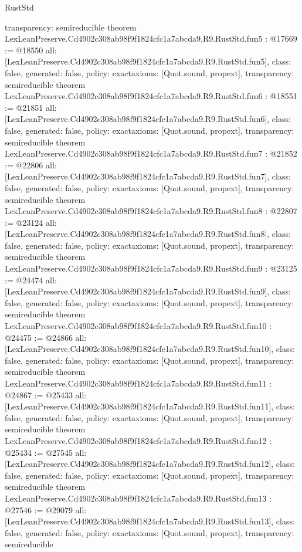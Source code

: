 \begin{lexlean}{RustStd}
\begin{coremodule}
{  transparency: semireducible
}
theorem LexLeanPreserve.Cd4902c308ab98f9f1824cfc1a7abcda9.R9.RustStd.fun5 : @17669 := @18550 {
  all: [LexLeanPreserve.Cd4902c308ab98f9f1824cfc1a7abcda9.R9.RustStd.fun5],
  class: false,
  generated: false,
  policy: exact{axioms: [Quot.sound, propext]},
  transparency: semireducible
}
theorem LexLeanPreserve.Cd4902c308ab98f9f1824cfc1a7abcda9.R9.RustStd.fun6 : @18551 := @21851 {
  all: [LexLeanPreserve.Cd4902c308ab98f9f1824cfc1a7abcda9.R9.RustStd.fun6],
  class: false,
  generated: false,
  policy: exact{axioms: [Quot.sound, propext]},
  transparency: semireducible
}
theorem LexLeanPreserve.Cd4902c308ab98f9f1824cfc1a7abcda9.R9.RustStd.fun7 : @21852 := @22806 {
  all: [LexLeanPreserve.Cd4902c308ab98f9f1824cfc1a7abcda9.R9.RustStd.fun7],
  class: false,
  generated: false,
  policy: exact{axioms: [Quot.sound, propext]},
  transparency: semireducible
}
theorem LexLeanPreserve.Cd4902c308ab98f9f1824cfc1a7abcda9.R9.RustStd.fun8 : @22807 := @23124 {
  all: [LexLeanPreserve.Cd4902c308ab98f9f1824cfc1a7abcda9.R9.RustStd.fun8],
  class: false,
  generated: false,
  policy: exact{axioms: [Quot.sound, propext]},
  transparency: semireducible
}
theorem LexLeanPreserve.Cd4902c308ab98f9f1824cfc1a7abcda9.R9.RustStd.fun9 : @23125 := @24474 {
  all: [LexLeanPreserve.Cd4902c308ab98f9f1824cfc1a7abcda9.R9.RustStd.fun9],
  class: false,
  generated: false,
  policy: exact{axioms: [Quot.sound, propext]},
  transparency: semireducible
}
theorem LexLeanPreserve.Cd4902c308ab98f9f1824cfc1a7abcda9.R9.RustStd.fun10 : @24475 := @24866 {
  all: [LexLeanPreserve.Cd4902c308ab98f9f1824cfc1a7abcda9.R9.RustStd.fun10],
  class: false,
  generated: false,
  policy: exact{axioms: [Quot.sound, propext]},
  transparency: semireducible
}
theorem LexLeanPreserve.Cd4902c308ab98f9f1824cfc1a7abcda9.R9.RustStd.fun11 : @24867 := @25433 {
  all: [LexLeanPreserve.Cd4902c308ab98f9f1824cfc1a7abcda9.R9.RustStd.fun11],
  class: false,
  generated: false,
  policy: exact{axioms: [Quot.sound, propext]},
  transparency: semireducible
}
theorem LexLeanPreserve.Cd4902c308ab98f9f1824cfc1a7abcda9.R9.RustStd.fun12 : @25434 := @27545 {
  all: [LexLeanPreserve.Cd4902c308ab98f9f1824cfc1a7abcda9.R9.RustStd.fun12],
  class: false,
  generated: false,
  policy: exact{axioms: [Quot.sound, propext]},
  transparency: semireducible
}
theorem LexLeanPreserve.Cd4902c308ab98f9f1824cfc1a7abcda9.R9.RustStd.fun13 : @27546 := @29079 {
  all: [LexLeanPreserve.Cd4902c308ab98f9f1824cfc1a7abcda9.R9.RustStd.fun13],
  class: false,
  generated: false,
  policy: exact{axioms: [Quot.sound, propext]},
  transparency: semireducible
}
\end{coremodule}
\end{lexlean}
